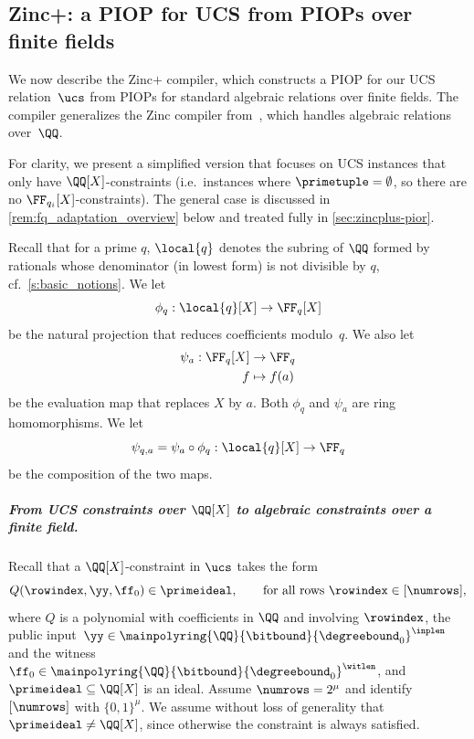 \subsection{Zinc+: a PIOP for UCS from PIOPs over finite fields}
\label{ss:to_zinc_plus_compiler}

We now describe the Zinc$+$ compiler, which constructs a PIOP for our UCS relation~$\ucs$ from PIOPs for standard algebraic relations over finite fields. The compiler generalizes the Zinc compiler from~\cite{Zinc}, which handles algebraic relations over~$\QQ$. %
%

For clarity, we present a simplified version that focuses on UCS instances that only have $\QQ[X]$-constraints (i.e.\ instances where $\primetuple=\emptyset$, so there are no $\FF_{q_i}[X]$-constraints). The general case  is discussed in \cref{rem:fq_adaptation_overview} below and treated fully in \cref{sec:zincplus-pior}.

Recall that for a prime $q$, $\local{q}$ denotes the subring of $\QQ$ formed by rationals whose denominator (in lowest form) is not divisible by $q$, cf.\ \cref{s:basic_notions}.  We let $$\phi_q:\local{q}[X]\to \FF_q[X]$$  be the natural projection that reduces coefficients modulo~$q$. We also let \begin{align*}\psi_{a}:\FF_q[X]&\to \FF_q\\ f&\mapsto f(a) \end{align*} be the evaluation map that replaces $X$ by $a$. Both $\phi_q$ and $\psi_{a}$ are ring homomorphisms. We let $$\psi_{q,a} = \psi_a \circ \phi_q:\local{q}[X]\to \FF_q$$ be the composition of the two maps.


\subparagraph{From UCS constraints over $\QQ[X]$ to algebraic constraints over a finite field.}

Recall that a $\QQ[X]$-constraint in $\ucs$ takes the form
\begin{equation}\label{eq:to_qx_constraint}
Q(\rowindex, \yy, \ff_0)\in \primeideal, \qquad \text{for all rows } \rowindex\in [\numrows],
\end{equation}
where $Q$ is a polynomial with coefficients in $\QQ$ and involving $\rowindex$, the public input~$\yy\in \mainpolyring{\QQ}{\bitbound}{\degreebound_0}^{\inplen}$ and the witness~$\ff_0\in \mainpolyring{\QQ}{\bitbound}{\degreebound_0}^{\witlen}$, and $\primeideal\subseteq \QQ[X]$ is an ideal. Assume $\numrows=2^\mu$ and identify $[\numrows]$ with $\{0,1\}^\mu$.  %
%
We assume without loss of generality that $\primeideal \neq \QQ[X]$, since otherwise the constraint is always satisfied.

